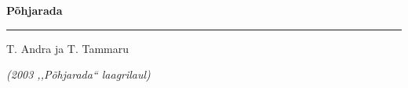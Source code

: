 \documentclass[12pt]{extbook}
\begin{document}
{
  \samepage
  \raggedbottom
  \raggedright
  \sloppy


  \vspace{0.2in}
    \centerline{
      \bfseries
      \large P\~ohjarada
    }
  \nopagebreak[4]
  \vspace{0.1in}
  \nopagebreak[4]
  \hrule height 0.05ex
  \nopagebreak[4]
  \vspace{-0.05in}

  {\footnotesize  \hfill T. Andra ja T. Tammaru }\\
  \vspace{0.01in}

  {\em {\footnotesize (2003 ,,P\~ohjarada{``} laagrilaul) } }
  \vspace{0.01in}


}
\end{document}
